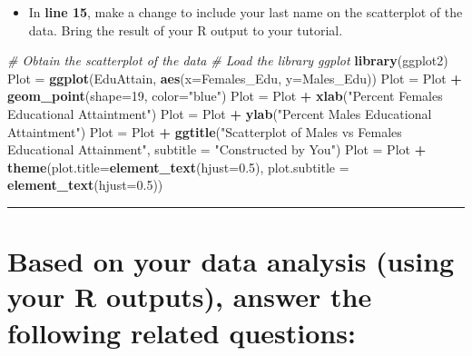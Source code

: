\documentclass[oneside,openany]{book}
\newenvironment{Shaded}{\begin{snugshade}}{\end{snugshade}}
\newcommand{\AttributeTok}[1]{\textcolor[rgb]{0.13,0.29,0.53}{#1}}
\newcommand{\CommentTok}[1]{\textcolor[rgb]{0.56,0.35,0.01}{\textit{#1}}}
\newcommand{\DecValTok}[1]{\textcolor[rgb]{0.00,0.00,0.81}{#1}}
\newcommand{\FloatTok}[1]{\textcolor[rgb]{0.00,0.00,0.81}{#1}}
\newcommand{\FunctionTok}[1]{\textcolor[rgb]{0.13,0.29,0.53}{\textbf{#1}}}
\newcommand{\NormalTok}[1]{#1}
\newcommand{\OtherTok}[1]{\textcolor[rgb]{0.56,0.35,0.01}{#1}}
\newcommand{\SpecialCharTok}[1]{\textcolor[rgb]{0.81,0.36,0.00}{\textbf{#1}}}
\newcommand{\StringTok}[1]{\textcolor[rgb]{0.31,0.60,0.02}{#1}}
\providecommand{\tightlist}{%
  \setlength{\itemsep}{0pt}\setlength{\parskip}{0pt}}
\begin{document}
\begin{enumerate}
  \begin{itemize}
  \tightlist
  \item
    In \textbf{line 15}, make a change to include your last name on the scatterplot of the data. Bring the result of your R output to your tutorial.
  \end{itemize}

\begin{Shaded}
\begin{Highlighting}[]
\CommentTok{\# Obtain the scatterplot of the data}
\CommentTok{\# Load the library ggplot}
\FunctionTok{library}\NormalTok{(ggplot2)}
\NormalTok{Plot }\OtherTok{=} \FunctionTok{ggplot}\NormalTok{(EduAttain, }\FunctionTok{aes}\NormalTok{(}\AttributeTok{x=}\NormalTok{Females\_Edu, }\AttributeTok{y=}\NormalTok{Males\_Edu))}
\NormalTok{Plot }\OtherTok{=}\NormalTok{ Plot }\SpecialCharTok{+} \FunctionTok{geom\_point}\NormalTok{(}\AttributeTok{shape=}\DecValTok{19}\NormalTok{, }\AttributeTok{color=}\StringTok{"blue"}\NormalTok{)}
\NormalTok{Plot }\OtherTok{=}\NormalTok{ Plot }\SpecialCharTok{+} \FunctionTok{xlab}\NormalTok{(}\StringTok{"Percent Females Educational Attaintment"}\NormalTok{) }
\NormalTok{Plot }\OtherTok{=}\NormalTok{ Plot }\SpecialCharTok{+} \FunctionTok{ylab}\NormalTok{(}\StringTok{"Percent Males Educational Attaintment"}\NormalTok{)}
\NormalTok{Plot }\OtherTok{=}\NormalTok{ Plot }\SpecialCharTok{+} \FunctionTok{ggtitle}\NormalTok{(}\StringTok{"Scatterplot of Males vs Females Educational Attainment"}\NormalTok{, }
                      \AttributeTok{subtitle =} \StringTok{"Constructed by You"}\NormalTok{)}
\NormalTok{Plot }\OtherTok{=}\NormalTok{ Plot }\SpecialCharTok{+} \FunctionTok{theme}\NormalTok{(}\AttributeTok{plot.title=}\FunctionTok{element\_text}\NormalTok{(}\AttributeTok{hjust=}\FloatTok{0.5}\NormalTok{), }
                    \AttributeTok{plot.subtitle =} \FunctionTok{element\_text}\NormalTok{(}\AttributeTok{hjust=}\FloatTok{0.5}\NormalTok{))  }
\end{Highlighting}
\end{Shaded}
\end{enumerate}

\begin{center}\rule{0.5\linewidth}{0.5pt}\end{center}

\section{Based on your data analysis (using your R outputs), answer the following related questions:}\label{based-on-your-data-analysis-using-your-r-outputs-answer-the-following-related-questions}
\end{document}

